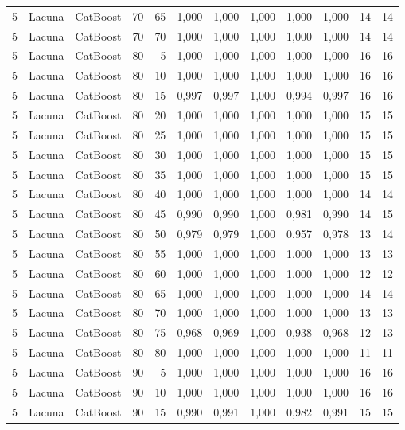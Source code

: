 \begin{longtable}{ccclrrrrrrrr}
5 & Lacuna & CatBoost & 70 & 65 & 1,000 & 1,000 & 1,000 & 1,000 & 1,000 & 14 & 14 \\
5 & Lacuna & CatBoost & 70 & 70 & 1,000 & 1,000 & 1,000 & 1,000 & 1,000 & 14 & 14 \\
5 & Lacuna & CatBoost & 80 & 5 & 1,000 & 1,000 & 1,000 & 1,000 & 1,000 & 16 & 16 \\
5 & Lacuna & CatBoost & 80 & 10 & 1,000 & 1,000 & 1,000 & 1,000 & 1,000 & 16 & 16 \\
5 & Lacuna & CatBoost & 80 & 15 & 0,997 & 0,997 & 1,000 & 0,994 & 0,997 & 16 & 16 \\
5 & Lacuna & CatBoost & 80 & 20 & 1,000 & 1,000 & 1,000 & 1,000 & 1,000 & 15 & 15 \\
5 & Lacuna & CatBoost & 80 & 25 & 1,000 & 1,000 & 1,000 & 1,000 & 1,000 & 15 & 15 \\
5 & Lacuna & CatBoost & 80 & 30 & 1,000 & 1,000 & 1,000 & 1,000 & 1,000 & 15 & 15 \\
5 & Lacuna & CatBoost & 80 & 35 & 1,000 & 1,000 & 1,000 & 1,000 & 1,000 & 15 & 15 \\
5 & Lacuna & CatBoost & 80 & 40 & 1,000 & 1,000 & 1,000 & 1,000 & 1,000 & 14 & 14 \\
5 & Lacuna & CatBoost & 80 & 45 & 0,990 & 0,990 & 1,000 & 0,981 & 0,990 & 14 & 15 \\
5 & Lacuna & CatBoost & 80 & 50 & 0,979 & 0,979 & 1,000 & 0,957 & 0,978 & 13 & 14 \\
5 & Lacuna & CatBoost & 80 & 55 & 1,000 & 1,000 & 1,000 & 1,000 & 1,000 & 13 & 13 \\
5 & Lacuna & CatBoost & 80 & 60 & 1,000 & 1,000 & 1,000 & 1,000 & 1,000 & 12 & 12 \\
5 & Lacuna & CatBoost & 80 & 65 & 1,000 & 1,000 & 1,000 & 1,000 & 1,000 & 14 & 14 \\
5 & Lacuna & CatBoost & 80 & 70 & 1,000 & 1,000 & 1,000 & 1,000 & 1,000 & 13 & 13 \\
5 & Lacuna & CatBoost & 80 & 75 & 0,968 & 0,969 & 1,000 & 0,938 & 0,968 & 12 & 13 \\
5 & Lacuna & CatBoost & 80 & 80 & 1,000 & 1,000 & 1,000 & 1,000 & 1,000 & 11 & 11 \\
5 & Lacuna & CatBoost & 90 & 5 & 1,000 & 1,000 & 1,000 & 1,000 & 1,000 & 16 & 16 \\
5 & Lacuna & CatBoost & 90 & 10 & 1,000 & 1,000 & 1,000 & 1,000 & 1,000 & 16 & 16 \\
5 & Lacuna & CatBoost & 90 & 15 & 0,990 & 0,991 & 1,000 & 0,982 & 0,991 & 15 & 15 \\

\end{longtable}
